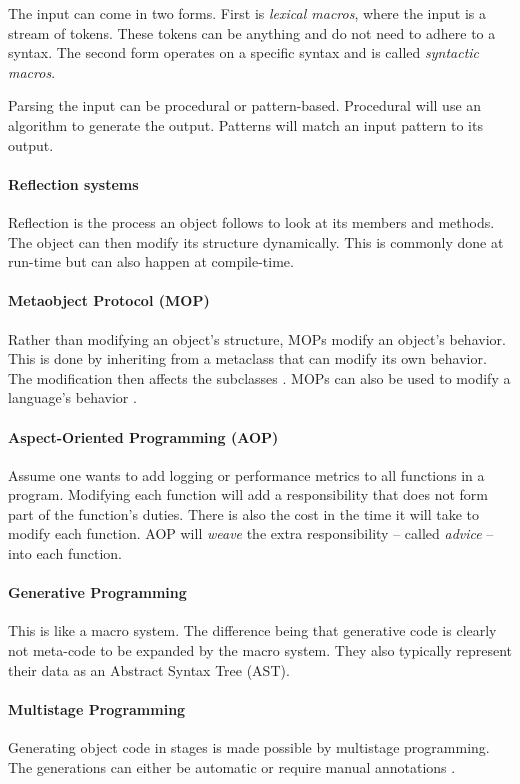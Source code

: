 The input can come in two forms.
First is \textit{lexical macros}, where the input is a stream of tokens.
These tokens can be anything and do not need to adhere to a syntax.
The second form operates on a specific syntax and is called \textit{syntactic macros}.

Parsing the input can be procedural or pattern-based.
Procedural will use an algorithm to generate the output.
Patterns will match an input pattern to its output.

\paragraph{Reflection systems}
Reflection is the process an object follows to look at its members and methods.
The object can then modify its structure dynamically.
This is commonly done at run-time but can also happen at compile-time.

\paragraph{Metaobject Protocol (MOP)}
Rather than modifying an object's structure, MOPs modify an object's behavior.
This is done by inheriting from a metaclass that can modify its own behavior.
The modification then affects the subclasses \cite{lee_95_01}.
MOPs can also be used to modify a language's behavior \cite{seaton_15_01}.

\paragraph{Aspect-Oriented Programming (AOP)}
Assume one wants to add logging or performance metrics to all functions in a program.
Modifying each function will add a responsibility that does not form part of the function's duties.
There is also the cost in the time it will take to modify each function.
AOP will \textit{weave} the extra responsibility -- called \textit{advice} -- into each function.

\paragraph{Generative Programming}
This is like a macro system.
The difference being that generative code is clearly not meta-code to be expanded by the macro system.
They also typically represent their data as an Abstract Syntax Tree (AST). 

\paragraph{Multistage Programming}
Generating object code in stages is made possible by multistage programming.
The generations can either be automatic or require manual annotations \cite{sheard_01_01, taha_04_01}.

